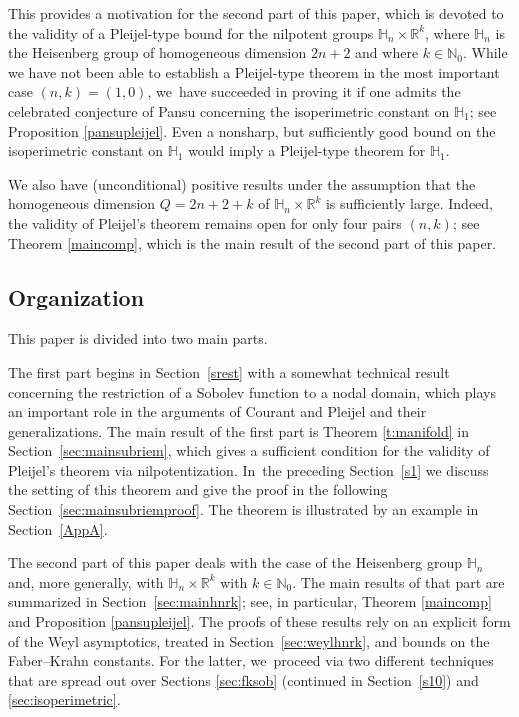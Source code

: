\documentclass[JEP,XML,SOM,Unicode,published]{cedram}
\theoremstyle{definition}
\newcommand{\1}{\mathbbm{1}}
\newcommand{\N}{\mathbb{N}}
\newcommand{\R}{\mathbb{R}}
\begin{document}
This provides a motivation for the second part of this paper, which is devoted to the validity of a Pleijel-type bound for the nilpotent groups $\mathbb H_n \times \mathbb R^k$, where $\mathbb H_n $ is the Heisenberg group of homogeneous dimension $2n+2$ and where $k\in\N_0$. While we have not been able to establish a Pleijel-type theorem in the most important case $(n,k)=(1,0)$, we~have succeeded in proving it if one admits the celebrated conjecture of Pansu concerning the isoperimetric constant on $\mathbb H_1$; see Proposition \ref{pansupleijel}. Even a nonsharp, but sufficiently good bound on the isoperimetric constant on $\mathbb H_1$ would imply a Pleijel-type theorem for $\mathbb H_1$.

We also have (unconditional) positive results under the assumption that the homogeneous dimension $Q=2n+2+k$ of $\mathbb H_n\times\R^k$ is sufficiently large. Indeed, the validity of Pleijel's theorem remains open for only four pairs $(n,k)$; see Theorem \ref{maincomp}, which is the main result of the second part of this paper.

\subsection{Organization}
This paper is divided into two main parts.

The first part begins in Section~\ref{srest} with a somewhat technical result concerning the restriction of a Sobolev function to a nodal domain, which plays an important role in the arguments of Courant and Pleijel and their generalizations. The main result of the first part is Theorem \ref{t:manifold} in Section~\ref{sec:mainsubriem}, which gives a sufficient condition for the validity of Pleijel's theorem via nilpotentization. In~the preceding Section~\ref{s1} we discuss the setting of this theorem and give the proof in the following Section~\ref{sec:mainsubriemproof}. The theorem is illustrated by an example in Section~\ref{AppA}.

The second part of this paper deals with the case of the Heisenberg group $\mathbb H_n$ and, more generally, with $\mathbb H_n\times\R^k$ with $k\in\N_0$. The main results of that part are summarized in Section~\ref{sec:mainhnrk}; see, in particular, Theorem \ref{maincomp} and Proposition \ref{pansupleijel}. The proofs of these results rely on an explicit form of the Weyl asymptotics, treated in Section~\ref{sec:weylhnrk}, and bounds on the Faber--Krahn constants. For the latter, we~proceed via two different techniques that are spread out over Sections \ref{sec:fksob} (continued in Section~\ref{s10}) and \ref{sec:isoperimetric}.
\end{document}
